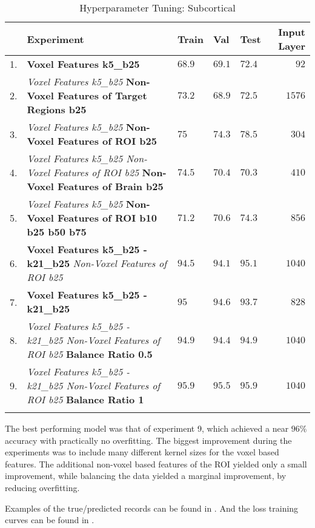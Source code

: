 \begin{longtable}[H]{|r|p{9cm}|l|l|l|r|}
\hline
 & \textbf{Experiment} & \textbf{Train} & \textbf{Val} & \textbf{Test} & \textbf{Input Layer} \\ \hline
1. & \textbf{Voxel Features k5\_b25} & $68.9$ & $69.1$ & $72.4$ & $92$  \\ \hline
2. & \emph{Voxel Features k5\_b25} \newline \textbf{Non-Voxel Features of Target Regions b25} & $73.2$ & $68.9$ & $72.5$ & $1576$ \\ \hline
3. & \emph{Voxel Features k5\_b25} \newline \textbf{Non-Voxel Features of ROI b25} & $75$ & $74.3$ & $78.5$ & $304$ \\ \hline
4. & \emph{Voxel Features k5\_b25 \newline Non-Voxel Features of ROI b25} \newline \textbf{Non-Voxel Features of Brain b25} & $74.5$ & $70.4$ & $70.3$ & $410$ \\ \hline
5. & \emph{Voxel Features k5\_b25} \newline \textbf{Non-Voxel Features of ROI b10 b25 b50 b75} & $71.2$ & $70.6$ & $74.3$ & $856$ \\ \hline
6. & \textbf{Voxel Features k5\_b25 - k21\_b25} \newline \emph{Non-Voxel Features of ROI b25} & $94.5$ & $94.1$ & $95.1$ & $1040$ \\ \hline
7. & \textbf{Voxel Features k5\_b25 - k21\_b25} & $95$ & $94.6$ & $93.7$ & $828$ \\ \hline
8. & \emph{Voxel Features k5\_b25 - k21\_b25 \newline Non-Voxel Features of ROI b25} \newline \textbf{Balance Ratio 0.5} & $94.9$ & $94.4$ & $94.9$ & $1040$ \\ \hline
9. & \emph{Voxel Features k5\_b25 - k21\_b25 \newline Non-Voxel Features of ROI b25} \newline \textbf{Balance Ratio 1} & $95.9$ & $95.5$ & $95.9$ & $1040$ \\ \hline
\caption{Hyperparameter Tuning: Subcortical}
\label{tab:expsub}
\end{longtable}

The best performing model was that of experiment 9, which achieved a near $96\%$ accuracy with practically no overfitting. The biggest improvement during the experiments was to include many different kernel sizes for the voxel based features. The additional non-voxel based features of the \ac{ROI} yielded only a small improvement, while balancing the data yielded a marginal improvement, by reducing overfitting.\par
Examples of the true/predicted records can be found in  . And the loss training curves can be found in .

